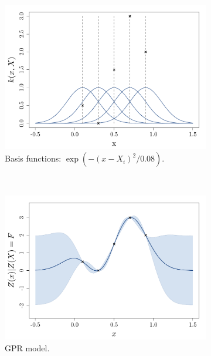 \documentclass[twoside,openright]{report}
\begin{document}
\begin{figure}
        \centering
        \begin{subfigure}[t]{0.45\textwidth}
                \includegraphics[width=\textwidth]{figures/ch2_basisfuncGauss}
                \caption{Basis functions: $\exp(-(x-X_i)^2/0.08)$.}
        \end{subfigure}%
        ~         
        \begin{subfigure}[t]{0.45\textwidth}
                \includegraphics[width=\textwidth]{figures/ch2_GPRbasisfuncGauss}
                \caption{GPR model.}
        \end{subfigure}%
        \\
        \begin{subfigure}[t]{0.45\textwidth}

\end{subfigure}
\end{figure}
\end{document}
